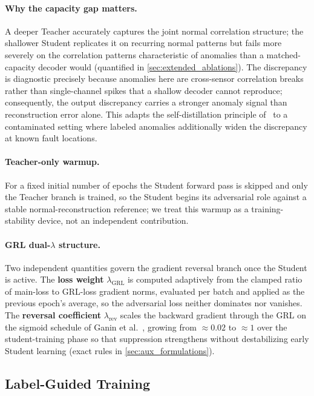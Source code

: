 \paragraph{Why the capacity gap matters.}
A deeper Teacher accurately captures the joint normal correlation structure; the shallower Student
replicates it on recurring normal patterns but fails more severely on the correlation patterns
characteristic of anomalies than a matched-capacity decoder would
(quantified in \ref{sec:extended_ablations}).
The discrepancy is diagnostic precisely because anomalies here are cross-sensor correlation breaks
rather than single-channel spikes that a shallow decoder cannot reproduce; consequently, the output
discrepancy carries a stronger anomaly signal than reconstruction error alone.
This adapts the self-distillation principle of~\cite{zhang2022selfdistill,ristea2024sdmae} to a
contaminated setting where labeled anomalies additionally widen the discrepancy at known fault
locations.

\paragraph{Teacher-only warmup.}
For a fixed initial number of epochs the Student forward pass is skipped and only the Teacher
branch is trained, so the Student begins its adversarial role against a stable
normal-reconstruction reference; we treat this warmup as a training-stability device, not an
independent contribution.

\paragraph{GRL dual-$\lambda$ structure.}
Two independent quantities govern the gradient reversal branch once the Student is active.
The \textbf{loss weight} $\lambda_{\mathrm{GRL}}$ is computed adaptively from the clamped ratio
of main-loss to GRL-loss gradient norms, evaluated per batch and applied as the previous epoch's
average, so the adversarial loss neither dominates nor vanishes.
The \textbf{reversal coefficient} $\lambda_{\mathrm{rev}}$ scales the backward gradient through
the GRL on the sigmoid schedule of Ganin et al.~\cite{ganin2016dann}, growing from ${\approx}0.02$ to
${\approx}1$ over the student-training phase so that suppression strengthens without
destabilizing early Student learning (exact rules in \ref{sec:aux_formulations}).

\subsection{Label-Guided Training}
\label{sec:label_training}

